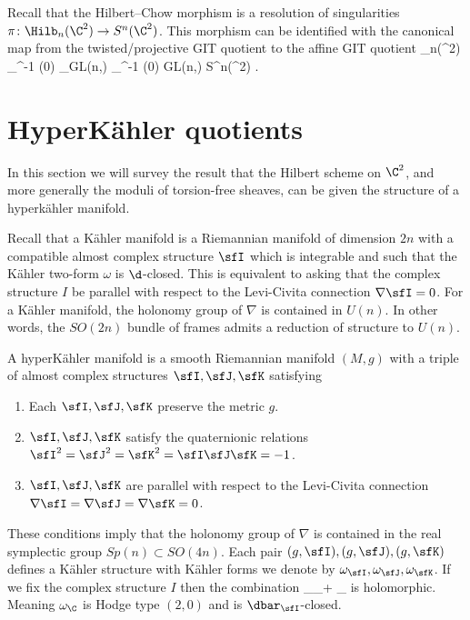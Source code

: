 \documentclass[../master.tex]{subfiles}
\begin{document}
Recall that the Hilbert--Chow morphism is a resolution of singularities $\pi \colon \Hilb_n(\C^2) \to S^n(\C^2)$.
This morphism can be identified with the canonical map from the twisted/projective GIT quotient to the affine GIT quotient
\beqn
\Hilb_n(\C^2) \simeq \mu_\C^{-1} (0) \sslash_\chi GL(n,\C) \xto{\pi} \mu_\C^{-1} (0) \sslash GL(n,\C) \simeq S^n(\C^2) .
\eeqn

\section{HyperK\"ahler quotients}

In this section we will survey the result that the Hilbert scheme on $\C^2$, and more generally the moduli of torsion-free sheaves, can be given the structure of a hyperk\"ahler manifold.

Recall that a K\"ahler manifold is a Riemannian manifold of dimension $2n$ with a compatible almost complex structure $\sfI$ which is integrable and such that the K\"ahler two-form $\omega$ is $\d$-closed.
This is equivalent to asking that the complex structure $I$ be parallel with respect to the Levi-Civita connection $\nabla \sfI = 0$.
For a K\"ahler manifold, the holonomy group of $\nabla$ is contained in $U(n)$.
In other words, the $SO(2n)$ bundle of frames admits a reduction of structure to $U(n)$.

A hyperK\"ahler manifold is a smooth Riemannian manifold $(M,g)$ with a triple of almost complex structures $\sfI,\sfJ,\sfK$ satisfying
\begin{enumerate}
\item Each $\sfI,\sfJ,\sfK$ preserve the metric $g$.
\item $\sfI,\sfJ,\sfK$ satisfy the quaternionic relations $\sfI^2=\sfJ^2=\sfK^2=\sfI\sfJ\sfK=-1$.
\item $\sfI,\sfJ,\sfK$ are parallel with respect to the Levi-Civita connection $\nabla \sfI = \nabla \sfJ = \nabla \sfK = 0$.
\end{enumerate}

These conditions imply that the holonomy group of $\nabla$ is contained in the real symplectic group $Sp(n) \subset SO(4n)$.
Each pair $(g,\sfI),(g,\sfJ),(g,\sfK)$ defines a K\"ahler structure with K\"ahler forms we denote by $\omega_\sfI,\omega_\sfJ,\omega_\sfK$.
If we fix the complex structure $I$ then the combination 
\beqn
\omega_\C {} \omega_\sfJ + \im \omega_\sfK 
\eeqn
is holomorphic.
Meaning $\omega_\C$ is Hodge type $(2,0)$ and is $\dbar_\sfI$-closed.
\end{document}
